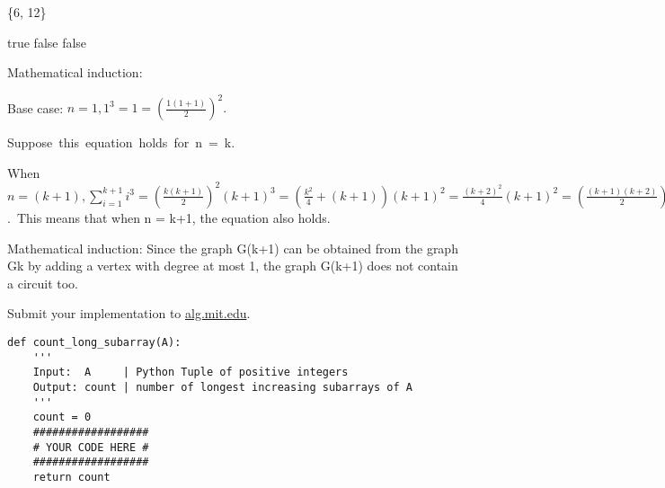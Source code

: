\documentclass[12pt,twoside]{article}
\begin{document}

\begin{problems}

\problem  %

\begin{problemparts}
\problempart %
\{6, 12\}
\end{problemparts}

\problem  %

\begin{problemparts}
\problempart %
\end{problemparts}

\problem  %

\begin{problemparts}
\problempart %
true %
\problempart %
false
\problempart %
false
\end{problemparts}

\problem  %

Mathematical induction: 

Base case: $n = 1, 1^{3} = 1 = ({\frac{1(1+1)}{2}})^2.$ 

Suppose\ this\ equation\ holds\ for\ n\ =\ k.

When $n = (k+1), \sum_{i=1}^{k+1}i^{3} =  ({\frac{k(k+1)}{2}})^2 (k+1)^{3} = (\frac{k^{2}}{4} + (k+1))(k+1)^{2} = \frac{(k+2)^{2}}{4}(k+1)^2 = (\frac{(k+1)(k+2)}{2})^{2}$.\ This means that when n = k+1, the equation also holds.

\newpage
\problem  %

Mathematical induction:
Since the graph G(k+1) can be obtained from the graph G{k} by adding a vertex with degree at most 1, the graph G(k+1) does not contain a circuit too.

\vfill
\problem  %
Submit your implementation to {\small\url{alg.mit.edu}}.

\begin{lstlisting}
def count_long_subarray(A):
    '''
    Input:  A     | Python Tuple of positive integers
    Output: count | number of longest increasing subarrays of A
    '''
    count = 0
    ##################
    # YOUR CODE HERE #
    ##################
    return count
\end{lstlisting}

\end{problems}
\end{document}
